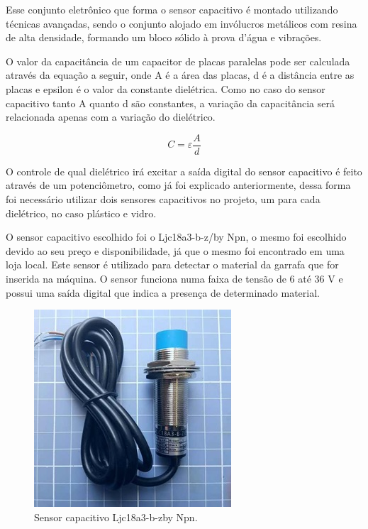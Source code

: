 Esse conjunto eletrônico que forma o sensor capacitivo é montado utilizando técnicas avançadas, sendo o conjunto alojado em invólucros metálicos com resina de alta densidade, formando um bloco sólido à prova d’água e vibrações. \cite{sensorCapacitivo}

O valor da capacitância de um capacitor de placas paralelas pode ser calculada através da equação a seguir, onde A é a área das placas, d é a distância entre as placas e epsilon é o valor da constante dielétrica. Como no caso do sensor capacitivo tanto A quanto d são constantes, a variação da capacitância será relacionada apenas com a variação do dielétrico.

\begin{equation}
    C = \varepsilon \frac{A}{d}
\end{equation}

O controle de qual dielétrico irá excitar a saída digital do sensor capacitivo é feito através de um potenciômetro, como já foi explicado anteriormente, dessa forma foi necessário utilizar dois sensores capacitivos no projeto, um para cada dielétrico, no caso plástico e vidro.

O sensor capacitivo escolhido foi o Ljc18a3-b-z/by Npn, o mesmo foi escolhido devido ao seu preço e disponibilidade, já que o mesmo foi encontrado em uma loja local. Este sensor é utilizado para detectar o material da garrafa que for inserida na máquina. O sensor funciona numa faixa de tensão de 6 até 36 V e possui uma saída digital que indica a presença de determinado material.

\begin{figure}[!ht]
	\centering
		\includegraphics[scale=0.5]{figuras/eletronica/10-Sensor-capacitivo.jpg}
	\caption{Sensor capacitivo Ljc18a3-b-zby Npn.}
\end{figure}

